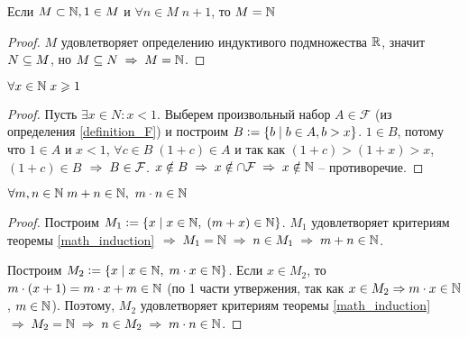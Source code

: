 \begin{theorem} \label{math_induction}
    Если $ M \subset \mathbb{N}, 1 \in M $\! и $ \forall n \in M \; n + 1 $, то $ M = \mathbb{N} $
\end{theorem} \begin{proof}
    $ M $ удовлетворяет определению индуктивого подмножества $ \mathbb{R} $, значит $ N \subseteq M $, но $ M \sub N \thus M = \N$.
\end{proof}
\begin{theorem}
    $ \forall x \in \mathbb{N} \; x \geqslant 1 $
\end{theorem}
\begin{proof}
    Пусть $\exists x \in N : x < 1$. Выберем произвольный набор $A \in \mathcal{F}$ (из определения \ref{definition_F}) и построим $B \vcentcolon= \{b \;\vert\; b \in A, b > x\}$. $1 \in B$, потому что $1 \in A$ и $x < 1$, $\forall c \in B \; (1 + c) \in A$ и так как $(1 + c) > (1 + x) > x$, $(1 + c) \in B$ $\thus B \in \mathcal{F}$. $x \notin B \thus x \notin \cap \mathcal{F} \thus  x \notin \N$ -- противоречие.
\end{proof}
\begin{theorem}
    $ \forall m, n \in \mathbb{N} \; m + n \in \mathbb{N},\ m \cdot n \in \mathbb{N}$
\end{theorem}
\begin{proof}
    Построим $M_1 \vcentcolon= \{x \;\vert\; x \in \mathbb{N},\; (m + x) \in \mathbb{N}\}$. $M_1$ удовлетворяет критериям теоремы \ref{math_induction} $\thus M_1 = \N \thus n \in M_1 \thus m + n \in \N$.

    Построим $M_2 \vcentcolon= \{x \;\vert\; x \in \mathbb{N},\; m \cdot x \in \mathbb{N}\}$. Если $x \in M_2$, то $m \cdot (x + 1) = m \cdot x + m \in \mathbb{N}$ (по 1 части утвержения, так как $x \in M_2 \Rightarrow m \cdot x \in \mathbb{N}$, $m \in \mathbb{N}$). Поэтому, $M_2$ удовлетворяет критериям теоремы \ref{math_induction} $\thus M_2 = \N \thus n \in M_2 \thus m \cdot n \in \N$.
\end{proof}